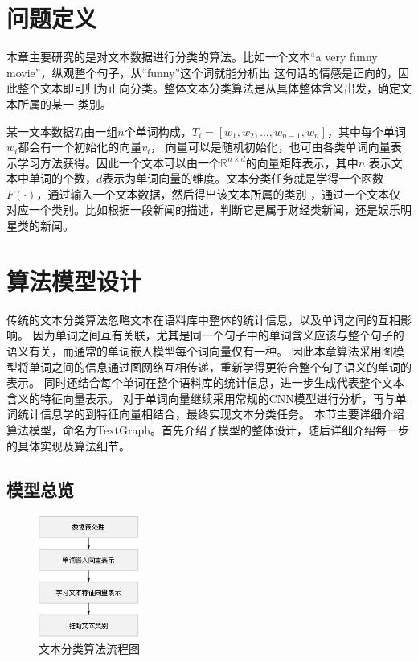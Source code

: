 \section{问题定义}
本章主要研究的是对文本数据进行分类的算法。比如一个文本“a very funny movie”，纵观整个句子，从“funny”这个词就能分析出
这句话的情感是正向的，因此整个文本即可归为正向分类。整体文本分类算法是从具体整体含义出发，确定文本所属的某一
类别。

某一文本数据$T_i$由一组$n$个单词构成，$T_i=[w_1,w_2,...,w_{n-1},w_n]$，其中每个单词$w_i$都会有一个初始化的向量$v_i$，
向量可以是随机初始化，也可由各类单词向量表示学习方法获得。因此一个文本可以由一个$\mathbb{R}^{n\times d}$的向量矩阵表示，其中$n$
表示文本中单词的个数，$d$表示为单词向量的维度。文本分类任务就是学得一个函数$F(\cdot)$，通过输入一个文本数据，然后得出该文本所属的类别
，通过一个文本仅对应一个类别。比如根据一段新闻的描述，判断它是属于财经类新闻，还是娱乐明星类的新闻。


\section{算法模型设计}
传统的文本分类算法忽略文本在语料库中整体的统计信息，以及单词之间的互相影响。
因为单词之间互有关联，尤其是同一个句子中的单词含义应该与整个句子的语义有关，而通常的单词嵌入模型每个词向量仅有一种。
因此本章算法采用图模型将单词之间的信息通过图网络互相传递，重新学得更符合整个句子语义的单词的表示。
同时还结合每个单词在整个语料库的统计信息，进一步生成代表整个文本含义的特征向量表示。
对于单词向量继续采用常规的CNN模型进行分析，再与单词统计信息学的到特征向量相结合，最终实现文本分类任务。
本节主要详细介绍算法模型，命名为TextGraph。首先介绍了模型的整体设计，随后详细介绍每一步的具体实现及算法细节。
\subsection{模型总览}
\begin{figure}[htb]%
	\setlength{\belowcaptionskip}{0pt}
	\centering
	\includegraphics[width=0.3\textwidth]{pic/textgraphLct.png}
	\caption{文本分类算法流程图}
	\label{textgraphLct}
\end{figure}

